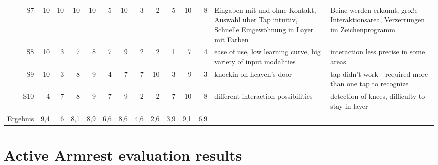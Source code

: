 \begin{landscape}
\begin{table}[htbp]
\begin{tabular}{rrrrrrrrrrrrm{4.5cm}m{4.5cm}}
    S7    & 10    & 10    & 10    & 10    & 5     & 10    & 3     & 2     & 5     & 10    & 8     & Eingaben mit und ohne Kontakt, Auswahl über Tap intuitiv, Schnelle Eingewöhnung in Layer mit Farben & Beine werden erkannt, große Interaktionsarea, Verzerrungen im Zeichenprogramm \\
    S8    & 10    & 3     & 7     & 8     & 7     & 9     & 2     & 2     & 1     & 7     & 4     & ease of use, low learning curve, big variety of input modalities & interaction less precise in some areas \\
    S9    & 10    & 3     & 8     & 9     & 4     & 7     & 7     & 10    & 3     & 9     & 3     & knockin on heaven's door & tap didn't work - required more than one tap to recognize \\
    S10   & 4     & 7     & 8     & 9     & 7     & 9     & 2     & 2     & 7     & 10    & 8     & different interaction possibilities & detection of knees, difficulty to stay in layer \\
    Ergebnis & 9,4   & 6     & 8,1   & 8,9   & 6,6   & 8,6   & 4,6   & 2,6   & 3,9   & 9,1   & 6,9   &       &  \\
    \bottomrule
    \end{tabular}%
  \label{tab:app_eval_captap_raw_quest}%
\end{table}%
\end{landscape}

\section{Active Armrest evaluation results}
